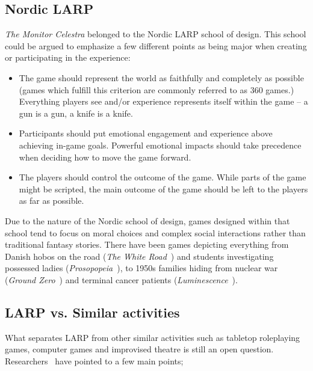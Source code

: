 \subsection{Nordic LARP}

\emph{The Monitor Celestra} belonged to the Nordic LARP school of design. This school could be argued to emphasize a few different points as being major when creating or participating in the experience: 

\begin{itemize}
    \item The game should represent the world as faithfully and completely as possible (games which fulfill this criterion are commonly referred to as 360\degree{} games.) Everything players see and/or experience represents itself within the game -- a gun is a gun, a knife is a knife.
\item Participants should put emotional engagement and experience above achieving in-game goals. Powerful emotional impacts should take precedence when deciding how to move the game forward.
\item The players should control the outcome of the game. While parts of the game might be scripted, the main outcome of the game should be left to the players as far as possible.
\end{itemize}

Due to the nature of the Nordic school of design, games designed within that school tend to focus on moral choices and complex social interactions rather than traditional fantasy stories. There have been games depicting everything from Danish hobos on the road (\emph{The White Road}~\cite{pedersen2008}) and students investigating possessed ladies (\emph{Prosopopeia}~\cite{jonsson2006prosopopeia, montola2006prosopopeia}), to 1950s families hiding from nuclear war (\emph{Ground Zero}~\cite{nordiclarp}) and terminal cancer patients (\emph{Luminescence}~\cite{nordiclarp}).

\subsection{LARP vs. Similar activities}

What separates LARP from other similar activities such as tabletop
roleplaying games, computer games and improvised theatre is still an
open question. Researchers~\cite{montola2012,turku3,henriksen2004}
have pointed to a few main points; 

